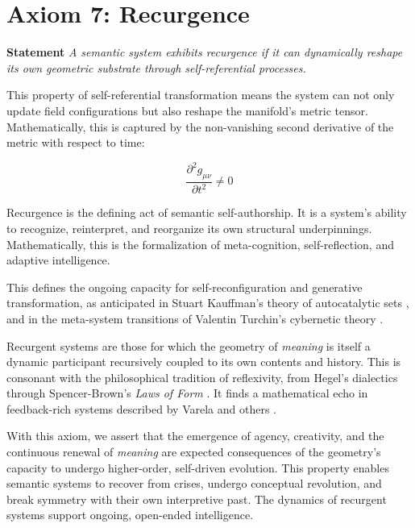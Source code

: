 \section{Axiom 7: Recurgence}
\label{1.7:axiom_7_recurgence}

\textbf{Statement} \textit{A semantic system exhibits recurgence if it can dynamically reshape its own geometric substrate through self-referential processes.}

This property of self-referential transformation means the system can not only update field configurations but also reshape the manifold's metric tensor. Mathematically, this is captured by the non-vanishing second derivative of the metric with respect to time:

\begin{equation}
\frac{\partial^2 g_{\mu\nu}}{\partial t^2} \neq 0
\end{equation} 

Recurgence is the defining act of semantic self-authorship. It is a system's ability to recognize, reinterpret, and reorganize its own structural underpinnings. Mathematically, this is the formalization of meta-cognition, self-reflection, and adaptive intelligence.

This defines the ongoing capacity for self-reconfiguration and generative transformation, as anticipated in Stuart Kauffman's theory of autocatalytic sets \autocite{Kauffman1993}, and in the meta-system transitions of Valentin Turchin's cybernetic theory \autocite{Turchin1977}.

Recurgent systems are those for which the geometry of \textit{meaning} is itself a dynamic participant recursively coupled to its own contents and history. This is consonant with the philosophical tradition of reflexivity, from Hegel's dialectics \autocite{Hegel1807} through Spencer-Brown's \textit{Laws of Form} \autocite{SpencerBrown1969}. It finds a mathematical echo in feedback-rich systems described by Varela and others \autocite{Varela1979, Rosen1991}.

With this axiom, we assert that the emergence of agency, creativity, and the continuous renewal of \textit{meaning} are expected consequences of the geometry's capacity to undergo higher-order, self-driven evolution. This property enables semantic systems to recover from crises, undergo conceptual revolution, and break symmetry with their own interpretive past. The dynamics of recurgent systems support ongoing, open-ended intelligence.